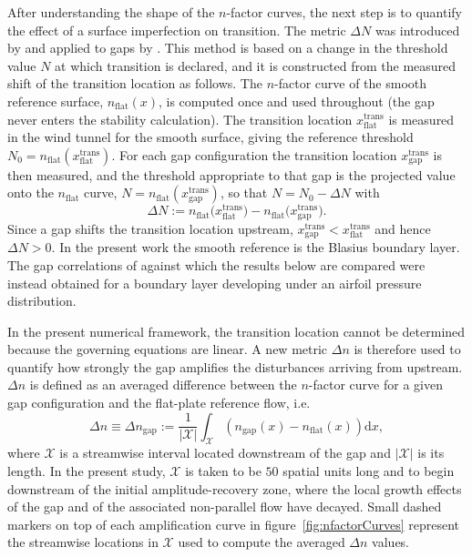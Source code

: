 \documentclass[lineno]{jfm}
\begin{document}
After understanding the shape of the $n$-factor curves, the next step is to quantify the effect of a surface imperfection on transition. The metric $\Delta N$ was introduced by \citet{crouchKosoryginNg2006} and applied to gaps by \citet{jeffGaps}. This method is based on a change in the threshold value $N$ at which transition is declared, and it is constructed from the measured shift of the transition location as follows. The $n$-factor curve of the smooth reference surface, $n_\mathrm{flat}(x)$, is computed once and used throughout (the gap never enters the stability calculation). The transition location $x_\mathrm{flat}^\mathrm{trans}$ is measured in the wind tunnel for the smooth surface, giving the reference threshold $N_0=n_\mathrm{flat}(x_\mathrm{flat}^\mathrm{trans})$. For each gap configuration the transition location $x_\mathrm{gap}^\mathrm{trans}$ is then measured, and the threshold appropriate to that gap is the projected value onto the $n_\mathrm{flat}$ curve, $N=n_\mathrm{flat}(x_\mathrm{gap}^\mathrm{trans})$, so that $N=N_0-\Delta N$ with
\begin{equation}
	\Delta N := n_\mathrm{flat}\big(x_\mathrm{flat}^\mathrm{trans}\big) - n_\mathrm{flat}\big(x_\mathrm{gap}^\mathrm{trans}\big).
\end{equation}
Since a gap shifts the transition location upstream, $x_\mathrm{gap}^\mathrm{trans} < x_\mathrm{flat}^\mathrm{trans}$ and hence $\Delta N > 0$. In the present work the smooth reference is the Blasius boundary layer. The gap correlations of \citet{jeffGaps} against which the results below are compared were instead obtained for a boundary layer developing under an airfoil pressure distribution.

In the present numerical framework, the transition location cannot be determined because the governing equations are linear. A new metric $\Delta n$ is therefore used to quantify how strongly the gap amplifies the disturbances arriving from upstream. $\Delta n$ is defined as an averaged difference between the $n$-factor curve for a given gap configuration and the flat-plate reference flow, i.e.
\begin{equation}\label{eq:deltan}
	\Delta n \equiv \Delta n_\mathrm{gap}:=\frac{1}{|\mathcal{X}|}\int_{\mathcal{X}} \left(n_\mathrm{gap}(x)-n_\mathrm{flat}(x)\right)\mathrm{d}x,
\end{equation}
where $\mathcal{X}$ is a streamwise interval located downstream of the gap and $|\mathcal{X}|$ is its length. In the present study, $\mathcal{X}$ is taken to be $50$ spatial units long and to begin downstream of the initial amplitude-recovery zone, where the local growth effects of the gap and of the associated non-parallel flow have decayed. Small dashed markers on top of each amplification curve in figure~\ref{fig:nfactorCurves} represent the streamwise locations in $\mathcal{X}$ used to compute the averaged $\Delta n$ values. 
\end{document}
